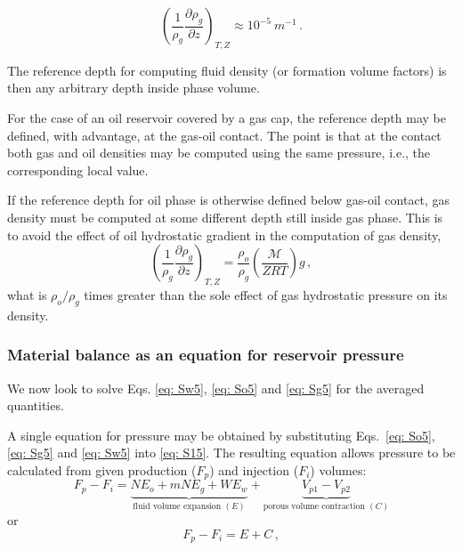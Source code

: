 \documentclass[authoryear,preprint,review,12pt]{elsarticle}
\begin{document}
\begin{equation}
\left(\frac{1}{\rho_g}\frac{\partial \rho_g}{\partial z}\right)_{T,Z} \approx 10^{-5}\ m^{-1} \, .
\end{equation}

The reference depth for computing fluid density (or formation volume factors) is then any arbitrary depth inside phase volume. 

For the case of an oil reservoir covered by a gas cap, the reference depth may be defined, with advantage, at the gas-oil contact. The point is that at the contact both gas and oil densities may be computed using the same pressure, i.e., the corresponding local value. 

If the reference depth for oil phase is otherwise defined below gas-oil contact, gas density must be computed at some different depth still inside gas phase. This is to avoid the effect of oil hydrostatic gradient in the computation of gas density,
\begin{equation}
\left(\frac{1}{\rho_g}\frac{\partial \rho_g}{\partial z}\right)_{T,Z} = \frac{\rho_o}{\rho_g}\left(\frac{\mathcal{M}}{Z R T}\right)g  \, ,
\end{equation}
what is $\rho_o / \rho_g$ times greater than the sole effect of gas hydrostatic pressure on its density.

\subsubsection{Material balance as an equation for reservoir pressure}




We now look to solve Eqs. \eqref{eq: Sw5}, \eqref{eq: So5} and \eqref{eq: Sg5} for the averaged quantities. 



A single equation for pressure may be obtained by substituting Eqs.~\eqref{eq: So5}, \eqref{eq: Sg5} and \eqref{eq: Sw5} into \eqref{eq: S15}. The resulting equation allows pressure to be calculated from given production ($F_p$) and injection ($F_i$) volumes:
\begin{equation}\label{eq: MBE}
F_p - F_i= \underbrace{N E_o + mN E_g + W E_w}_{\text{fluid volume expansion } (E)} +\underbrace{V_{p1}-V_{p2}}_{\text{porous volume contraction } (C)}
\end{equation}
or
\begin{equation}\label{eq: MBE_short}
F_p - F_i= E + C \, ,
\end{equation}
\end{document}
